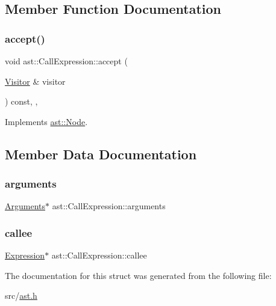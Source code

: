 \subsection{Member Function Documentation}
\mbox{\label{structast_1_1_call_expression_abc165321a5ce18456ae0eb51541a4b7e}} 
\subsubsection{\texorpdfstring{accept()}{accept()}}
{\footnotesize\ttfamily void ast\+::\+Call\+Expression\+::accept (\begin{DoxyParamCaption}\item[{\hyperlink{structast_1_1_visitor}{Visitor} \&}]{visitor }\end{DoxyParamCaption}) const\hspace{0.3cm}{\ttfamily [inline]}, {\ttfamily [override]}, {\ttfamily [virtual]}}



Implements \hyperlink{structast_1_1_node_abc089ee6caaf06a4445ebdd8391fdebc}{ast\+::\+Node}.



\subsection{Member Data Documentation}
\mbox{\label{structast_1_1_call_expression_a733b720a818f5c75f2ea96e40360a6ba}} 
\subsubsection{\texorpdfstring{arguments}{arguments}}
{\footnotesize\ttfamily \hyperlink{structast_1_1_arguments}{Arguments}$\ast$ ast\+::\+Call\+Expression\+::arguments}

\mbox{\label{structast_1_1_call_expression_a6b944439ac86b3d9a8bf984be9a213b9}} 
\subsubsection{\texorpdfstring{callee}{callee}}
{\footnotesize\ttfamily \hyperlink{structast_1_1_expression}{Expression}$\ast$ ast\+::\+Call\+Expression\+::callee}



The documentation for this struct was generated from the following file\+:\begin{DoxyCompactItemize}
\item 
src/\hyperlink{ast_8h}{ast.\+h}\end{DoxyCompactItemize}
